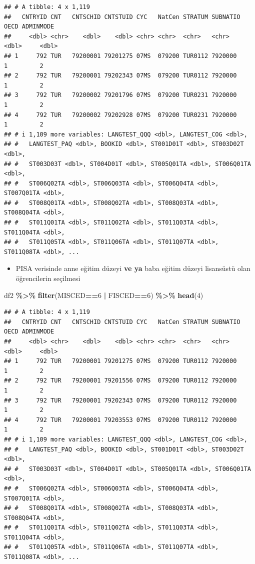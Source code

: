 \documentclass[
  oneside]{book}
\newenvironment{Shaded}{\begin{snugshade}}{\end{snugshade}}
\newcommand{\DecValTok}[1]{\textcolor[rgb]{0.00,0.00,0.81}{#1}}
\newcommand{\FunctionTok}[1]{\textcolor[rgb]{0.13,0.29,0.53}{\textbf{#1}}}
\newcommand{\NormalTok}[1]{#1}
\newcommand{\SpecialCharTok}[1]{\textcolor[rgb]{0.81,0.36,0.00}{\textbf{#1}}}
\providecommand{\tightlist}{%
  \setlength{\itemsep}{0pt}\setlength{\parskip}{0pt}}
\begin{document}
\begin{verbatim}
## # A tibble: 4 x 1,119
##   CNTRYID CNT   CNTSCHID CNTSTUID CYC   NatCen STRATUM SUBNATIO  OECD ADMINMODE
##     <dbl> <chr>    <dbl>    <dbl> <chr> <chr>  <chr>   <chr>    <dbl>     <dbl>
## 1     792 TUR   79200001 79201275 07MS  079200 TUR0112 7920000      1         2
## 2     792 TUR   79200001 79202343 07MS  079200 TUR0112 7920000      1         2
## 3     792 TUR   79200002 79201796 07MS  079200 TUR0231 7920000      1         2
## 4     792 TUR   79200002 79202928 07MS  079200 TUR0231 7920000      1         2
## # i 1,109 more variables: LANGTEST_QQQ <dbl>, LANGTEST_COG <dbl>,
## #   LANGTEST_PAQ <dbl>, BOOKID <dbl>, ST001D01T <dbl>, ST003D02T <dbl>,
## #   ST003D03T <dbl>, ST004D01T <dbl>, ST005Q01TA <dbl>, ST006Q01TA <dbl>,
## #   ST006Q02TA <dbl>, ST006Q03TA <dbl>, ST006Q04TA <dbl>, ST007Q01TA <dbl>,
## #   ST008Q01TA <dbl>, ST008Q02TA <dbl>, ST008Q03TA <dbl>, ST008Q04TA <dbl>,
## #   ST011Q01TA <dbl>, ST011Q02TA <dbl>, ST011Q03TA <dbl>, ST011Q04TA <dbl>,
## #   ST011Q05TA <dbl>, ST011Q06TA <dbl>, ST011Q07TA <dbl>, ST011Q08TA <dbl>, ...
\end{verbatim}

\begin{itemize}
\tightlist
\item
  PISA verisinde anne eğitim düzeyi \textbf{ve ya} baba eğitim düzeyi lisansüstü olan öğrencilerin seçilmesi
\end{itemize}

\begin{Shaded}
\begin{Highlighting}[]
\NormalTok{df2 }\SpecialCharTok{\%\textgreater{}\%} \FunctionTok{filter}\NormalTok{(MISCED}\SpecialCharTok{==}\DecValTok{6} \SpecialCharTok{|}\NormalTok{ FISCED}\SpecialCharTok{==}\DecValTok{6}\NormalTok{) }\SpecialCharTok{\%\textgreater{}\%} \FunctionTok{head}\NormalTok{(}\DecValTok{4}\NormalTok{)}
\end{Highlighting}
\end{Shaded}

\begin{verbatim}
## # A tibble: 4 x 1,119
##   CNTRYID CNT   CNTSCHID CNTSTUID CYC   NatCen STRATUM SUBNATIO  OECD ADMINMODE
##     <dbl> <chr>    <dbl>    <dbl> <chr> <chr>  <chr>   <chr>    <dbl>     <dbl>
## 1     792 TUR   79200001 79201275 07MS  079200 TUR0112 7920000      1         2
## 2     792 TUR   79200001 79201556 07MS  079200 TUR0112 7920000      1         2
## 3     792 TUR   79200001 79202343 07MS  079200 TUR0112 7920000      1         2
## 4     792 TUR   79200001 79203553 07MS  079200 TUR0112 7920000      1         2
## # i 1,109 more variables: LANGTEST_QQQ <dbl>, LANGTEST_COG <dbl>,
## #   LANGTEST_PAQ <dbl>, BOOKID <dbl>, ST001D01T <dbl>, ST003D02T <dbl>,
## #   ST003D03T <dbl>, ST004D01T <dbl>, ST005Q01TA <dbl>, ST006Q01TA <dbl>,
## #   ST006Q02TA <dbl>, ST006Q03TA <dbl>, ST006Q04TA <dbl>, ST007Q01TA <dbl>,
## #   ST008Q01TA <dbl>, ST008Q02TA <dbl>, ST008Q03TA <dbl>, ST008Q04TA <dbl>,
## #   ST011Q01TA <dbl>, ST011Q02TA <dbl>, ST011Q03TA <dbl>, ST011Q04TA <dbl>,
## #   ST011Q05TA <dbl>, ST011Q06TA <dbl>, ST011Q07TA <dbl>, ST011Q08TA <dbl>, ...
\end{verbatim}
\end{document}
